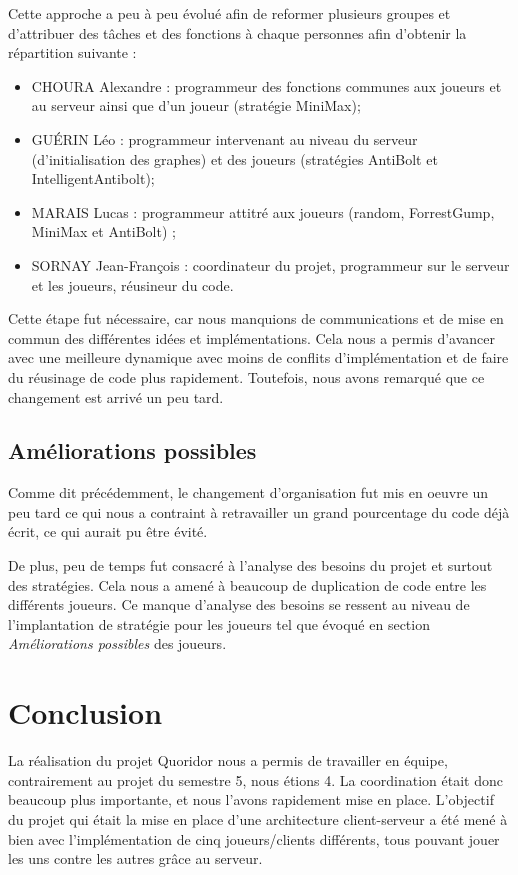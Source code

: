 \documentclass[11pt]{article}
\begin{document}
Cette approche a peu à peu évolué afin de reformer plusieurs groupes et d'attribuer des tâches et des fonctions à chaque personnes afin d'obtenir la répartition suivante :
\begin{itemize}
\item CHOURA Alexandre : programmeur des fonctions communes aux joueurs et au serveur ainsi que d'un joueur (stratégie MiniMax);
\item GUÉRIN Léo : programmeur intervenant au niveau du serveur (d'initialisation des graphes) et des joueurs (stratégies AntiBolt et IntelligentAntibolt);
\item MARAIS Lucas : programmeur attitré aux joueurs (random, ForrestGump, MiniMax et AntiBolt) ;
\item SORNAY Jean-François : coordinateur du projet, programmeur sur le serveur et les joueurs, réusineur du code.
\end{itemize}

Cette étape fut nécessaire, car nous manquions de communications et de mise en commun des différentes idées et implémentations. Cela nous a permis d'avancer avec une meilleure dynamique avec moins de conflits d'implémentation et de faire du réusinage de code plus rapidement. Toutefois, nous avons remarqué que ce changement est arrivé un peu tard.

\subsection{Améliorations possibles}

Comme dit précédemment, le changement d'organisation fut mis en oeuvre un peu tard ce qui nous a contraint à retravailler un grand pourcentage du code déjà écrit, ce qui aurait pu être évité.

De plus, peu de temps fut consacré à l'analyse des besoins du projet et surtout des stratégies. Cela nous a amené à beaucoup de duplication de code entre les différents joueurs.
Ce manque d'analyse des besoins se ressent au niveau de l'implantation de stratégie pour les joueurs tel que évoqué en section \textit{Améliorations possibles} des joueurs.

\newpage
\section{Conclusion}

La réalisation du projet Quoridor nous a permis de travailler en équipe, contrairement au projet du semestre 5, nous étions 4. La coordination était donc beaucoup plus importante, et nous l'avons rapidement mise en place. L'objectif du projet qui était la mise en place d'une architecture client-serveur a été mené à bien avec l'implémentation de cinq joueurs/clients différents, tous pouvant jouer les uns contre les autres grâce au serveur. \\
\end{document}
